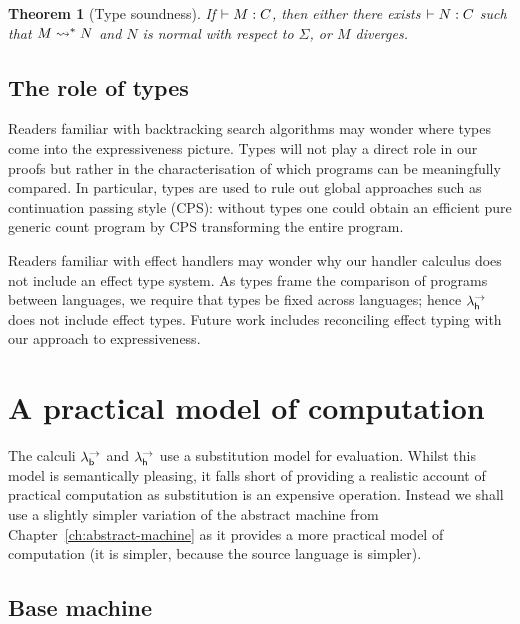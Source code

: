 \documentclass[12pt,phd,lfcs,twoside,openright,logo,leftchapter,normalheadings]{infthesis}
\theoremstyle{plain}
\newtheorem{theorem}{Theorem}[chapter]
\theoremstyle{definition}
\begin{document}
\begin{theorem}[Type soundness]
  If $\vdash M : C$, then either there exists $\vdash N : C$ such
  that $M \leadsto^* N$ and $N$ is normal with respect to $\Sigma$,
  or $M$ diverges.
\end{theorem}

\subsection{The role of types}

Readers familiar with backtracking search algorithms may wonder where
types come into the expressiveness picture.
%
Types will not play a direct role in our proofs but rather in the
characterisation of which programs can be meaningfully compared. In
particular, types are used to rule out global approaches such as
continuation passing style (CPS): without types one could obtain an
efficient pure generic count program by CPS transforming the entire
program.

Readers familiar with effect handlers may wonder why our handler
calculus does not include an effect type system.
%
As types frame the comparison of programs between languages, we
require that types be fixed across languages; hence $\lambda^\rightarrow_{\mathsf{h}}$ does not
include effect types.
%
Future work includes reconciling effect typing with our approach to
expressiveness.

\section{A practical model of computation}
\label{sec:abstract-machine-semantics}

The calculi $\lambda^\rightarrow_{\mathsf{b}}$ and $\lambda^\rightarrow_{\mathsf{h}}$ use a substitution model for
evaluation. Whilst this model is semantically pleasing, it falls short
of providing a realistic account of practical computation as
substitution is an expensive operation. Instead we shall use a
slightly simpler variation of the abstract machine from
Chapter~\ref{ch:abstract-machine} as it provides a more practical
model of computation (it is simpler, because the source language is
simpler).

\subsection{Base machine}
\label{sec:base-abstract-machine}

\newcommand{\Conf}{\dec{Conf}}
\newcommand{\EConf}{\dec{EConf}}
\newcommand{\MVal}{\dec{MVal}}
\end{document}
